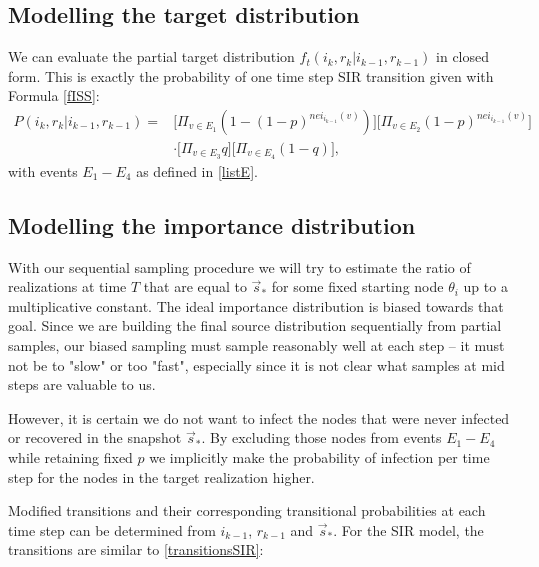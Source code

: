 \documentclass[times, utf8, diplomski]{fer}
\begin{document}
\subsection{Modelling the target distribution}
We can evaluate the partial target distribution $f_t(i_k, r_k | i_{k - 1}, r_{k - 1})$ in closed form. This is exactly the probability of one time step SIR transition given with Formula \ref{fISS}:
\begin{equation*}
\begin{split}
P(i_k, r_k | i_{k - 1}, r_{k - 1}) =  &\big[\Pi_{v \in E_1} (1 - (1 - p) ^ {nei_{i_{k-1}}(v)})\big]\big[\Pi_{v \in E_2} (1 - p)^{nei_{i_{k-1}}(v)} \big] \\& \cdot
\big[\Pi_{v \in E_3} q\big]\big[ \Pi_{v \in E_4} (1 - q)\big],
\end{split}
\end{equation*}
with events $E_1 - E_4$ as defined in \ref{listE}. 

\subsection{Modelling the importance distribution}
With our sequential sampling procedure we will try to estimate the ratio of realizations at time $T$ that are equal to $\vec s_*$ for some fixed starting node $\theta_i$ up to a multiplicative constant. The ideal importance distribution is biased towards that goal. Since we are building the final source distribution sequentially from partial samples, our biased sampling must sample reasonably well at each step -- it must not be to "slow" or too "fast", especially since it is not clear what samples at mid steps are valuable to us.

However, it is certain we do not want to infect the nodes that were never infected or recovered in the snapshot $\vec s_*$. By excluding those nodes from events $E_1 - E_4$ while retaining fixed $p$ we implicitly make the probability of infection per time step for the nodes in the target realization higher. 

Modified transitions and their corresponding transitional probabilities at each time step can be determined from $i_{k - 1}$, $r_{k - 1}$ and $\vec s_*$. For the SIR model, the transitions are similar to \ref{transitionsSIR}:
\end{document}
